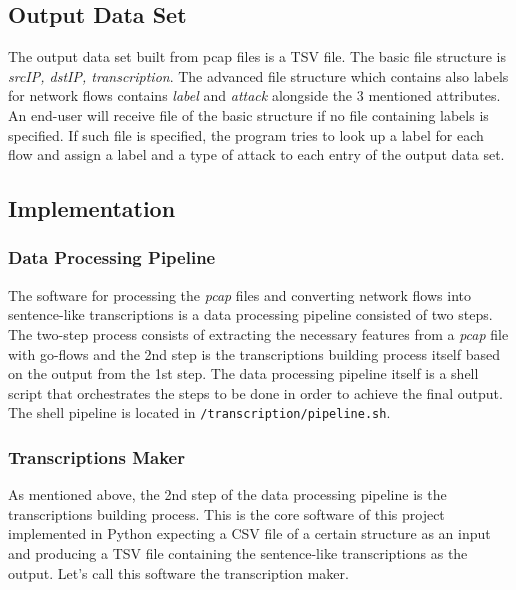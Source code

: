\documentclass{article}
\begin{document}

    \subsection{Output Data Set}

    The output data set built from pcap files is a TSV file. The basic file structure is \textit{srcIP, dstIP, transcription}. The advanced file structure which contains also labels for network flows contains \textit{label} and \textit{attack} alongside the 3 mentioned attributes. An end-user will receive file of the basic structure if no file containing labels is specified. If such file is specified, the program tries to look up a label for each flow and assign a label and a type of attack to each entry of the output data set.



    \subsection{Implementation}

    \subsubsection{Data Processing Pipeline}
    The software for processing the \textit{pcap} files and converting network flows into sentence-like transcriptions is a data processing pipeline consisted of two steps. The two-step process consists of extracting the necessary features from a \textit{pcap} file with go-flows and the 2nd step is the transcriptions building process itself based on the output from the 1st step. The data processing pipeline itself is a shell script that orchestrates the steps to be done in order to achieve the final output. The shell pipeline is located in \verb|/transcription/pipeline.sh|.


    \subsubsection{Transcriptions Maker}
    As mentioned above, the 2nd step of the data processing pipeline is the transcriptions building process. This is the core software of this project implemented in Python expecting a CSV file of a certain structure as an input and producing a TSV file containing the sentence-like transcriptions as the output. Let's call this software the transcription maker.
\end{document}
